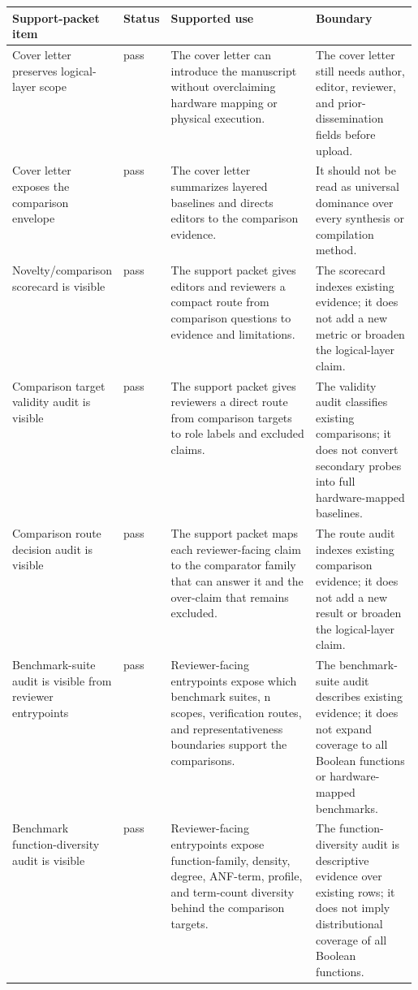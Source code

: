 \begin{tabularx}{\linewidth}{>{\raggedright\arraybackslash}p{0.22\linewidth}>{\raggedright\arraybackslash}p{0.11\linewidth}>{\raggedright\arraybackslash}X>{\raggedright\arraybackslash}p{0.25\linewidth}}
\toprule
Support-packet item & Status & Supported use & Boundary \\
\midrule
Cover letter preserves logical-layer scope & pass & The cover letter can introduce the manuscript without overclaiming hardware mapping or physical execution. & The cover letter still needs author, editor, reviewer, and prior-dissemination fields before upload. \\
Cover letter exposes the comparison envelope & pass & The cover letter summarizes layered baselines and directs editors to the comparison evidence. & It should not be read as universal dominance over every synthesis or compilation method. \\
Novelty/comparison scorecard is visible & pass & The support packet gives editors and reviewers a compact route from comparison questions to evidence and limitations. & The scorecard indexes existing evidence; it does not add a new metric or broaden the logical-layer claim. \\
Comparison target validity audit is visible & pass & The support packet gives reviewers a direct route from comparison targets to role labels and excluded claims. & The validity audit classifies existing comparisons; it does not convert secondary probes into full hardware-mapped baselines. \\
Comparison route decision audit is visible & pass & The support packet maps each reviewer-facing claim to the comparator family that can answer it and the over-claim that remains excluded. & The route audit indexes existing comparison evidence; it does not add a new result or broaden the logical-layer claim. \\
Benchmark-suite audit is visible from reviewer entrypoints & pass & Reviewer-facing entrypoints expose which benchmark suites, n scopes, verification routes, and representativeness boundaries support the comparisons. & The benchmark-suite audit describes existing evidence; it does not expand coverage to all Boolean functions or hardware-mapped benchmarks. \\
Benchmark function-diversity audit is visible & pass & Reviewer-facing entrypoints expose function-family, density, degree, ANF-term, profile, and term-count diversity behind the comparison targets. & The function-diversity audit is descriptive evidence over existing rows; it does not imply distributional coverage of all Boolean functions. \\

\end{tabularx}
